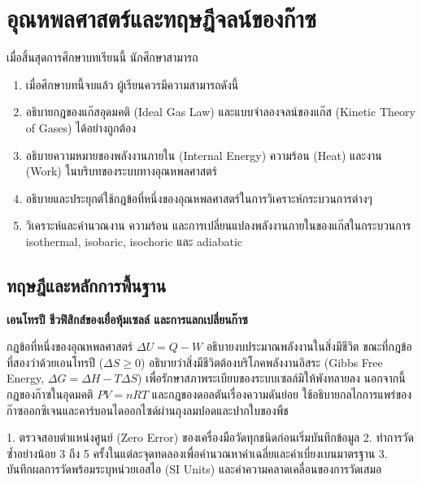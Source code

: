 \chapter{อุณหพลศาสตร์และทฤษฎีจลน์ของก๊าซ}
\label{ch:ch10_thermodynamics_gases}

\begin{conceptbox}[title=วัตถุประสงค์การเรียนรู้ประจำบท]
เมื่อสิ้นสุดการศึกษาบทเรียนนี้ นักศึกษาสามารถ
\begin{enumerate}
    \item เมื่อศึกษาบทนี้จบแล้ว ผู้เรียนควรมีความสามารถดังนี้
    \item อธิบายกฎของแก๊สอุดมคติ (Ideal Gas Law) และแบบจำลองจลน์ของแก๊ส (Kinetic Theory of Gases) ได้อย่างถูกต้อง
    \item อธิบายความหมายของพลังงานภายใน (Internal Energy) ความร้อน (Heat) และงาน (Work) ในบริบทของระบบทางอุณหพลศาสตร์
    \item อธิบายและประยุกต์ใช้กฎข้อที่หนึ่งของอุณหพลศาสตร์ในการวิเคราะห์กระบวนการต่างๆ
    \item วิเคราะห์และคำนวณงาน ความร้อน และการเปลี่ยนแปลงพลังงานภายในของแก๊สในกระบวนการ isothermal, isobaric, isochoric และ adiabatic
\end{enumerate}
\end{conceptbox}

\section{ทฤษฎีและหลักการพื้นฐาน}

\begin{bioappbox}
\textbf{เอนโทรปี ชีวฟิสิกส์ของเยื่อหุ้มเซลล์ และการแลกเปลี่ยนก๊าซ}

กฎข้อที่หนึ่งของอุณหพลศาสตร์ $\Delta U = Q - W$ อธิบายงบประมาณพลังงานในสิ่งมีชีวิต ขณะที่กฎข้อที่สองว่าด้วยเอนโทรปี ($\Delta S \ge 0$) อธิบายว่าสิ่งมีชีวิตต้องบริโภคพลังงานอิสระ (Gibbs Free Energy, $\Delta G = \Delta H - T\Delta S$) เพื่อรักษาสภาพระเบียบของระบบเซลล์มิให้พังทลายลง นอกจากนี้ กฎของก๊าซในอุดมคติ $PV = nRT$ และกฎของดอลตันเรื่องความดันย่อย ใช้อธิบายกลไกการแพร่ของก๊าซออกซิเจนและคาร์บอนไดออกไซด์ผ่านถุงลมปอดและปากใบของพืช
\end{bioappbox}

\begin{labbox}
1. ตรวจสอบตำแหน่งศูนย์ (Zero Error) ของเครื่องมือวัดทุกชนิดก่อนเริ่มบันทึกข้อมูล
2. ทำการวัดซ้ำอย่างน้อย 3 ถึง 5 ครั้งในแต่ละจุดทดลองเพื่อคำนวณหาค่าเฉลี่ยและค่าเบี่ยงเบนมาตรฐาน
3. บันทึกผลการวัดพร้อมระบุหน่วยเอสไอ (SI Units) และค่าความคลาดเคลื่อนของการวัดเสมอ
\end{labbox}

